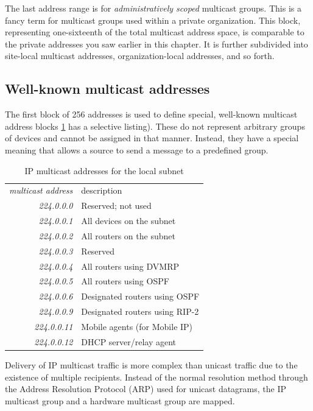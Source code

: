 \documentclass[b5paper,11pt]{memoir}
\begin{document}
The last address range is for {\emph{administratively scoped}} multicast
groups. This is a fancy term for multicast groups used within a private
organization. This block, representing one-sixteenth of the total
multicast address space, is comparable to the private addresses you saw
earlier in this chapter. It is further subdivided into site-local
multicast addresses, organization-local addresses, and so
forth.

\subsection{Well-known multicast addresses}

The first block of 256 addresses is used to define special, well-known multicast address blocks \cref{tab:link-local-multicast} has a selective listing).
These do not represent arbitrary groups of devices and cannot be assigned in that manner.
Instead, they have a
special meaning that allows a source to send a message to a predefined
group.


\begin{table}
   \centering
   \begin{tabular}{rl}
   \emph{multicast address} & description\\[.75ex]
   \textit{224.0.0.0}       & Reserved; not used\\
   \textit{224.0.0.1}       & All devices on the subnet\\
   \textit{224.0.0.2}       & All routers on the subnet\\
   \textit{224.0.0.3}       & Reserved\\
   \textit{224.0.0.4}       & All routers using DVMRP\\
   \textit{224.0.0.5}       & All routers using OSPF\\
   \textit{224.0.0.6}       & Designated routers using OSPF\\
   \textit{224.0.0.9}       & Designated routers using RIP-2\\
   \textit{224.0.0.11}      & Mobile agents (for Mobile IP)\\
   \textit{224.0.0.12}      & DHCP server/relay agent\\
   \end{tabular}
   \caption{IP multicast addresses for the local subnet}
   \label{tab:link-local-multicast}
\end{table}

Delivery of IP multicast traffic is more complex than unicast traffic due to the existence of multiple recipients.
Instead of the normal resolution method through the Address Resolution Protocol (ARP) used for unicast datagrams, the IP multicast group and a hardware multicast group are mapped.
\end{document}
